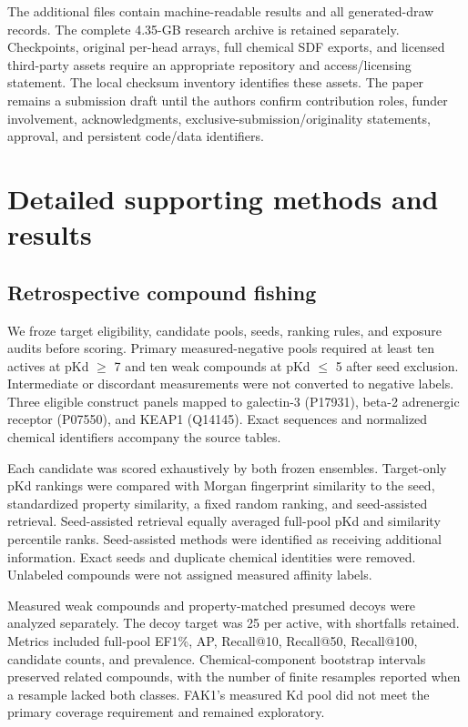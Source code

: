 \documentclass[12pt,a4paper]{article}
\begin{document}
The additional files contain machine-readable results and all generated-draw records. The complete 4.35-GB research archive is retained separately. Checkpoints, original per-head arrays, full chemical SDF exports, and licensed third-party assets require an appropriate repository and access/licensing statement. The local checksum inventory identifies these assets. The paper remains a submission draft until the authors confirm contribution roles, funder involvement, acknowledgments, exclusive-submission/originality statements, approval, and persistent code/data identifiers.

\section*{Detailed supporting methods and results}
\subsection*{Retrospective compound fishing}
We froze target eligibility, candidate pools, seeds, ranking rules, and exposure audits before scoring. Primary measured-negative pools required at least ten actives at pKd \(\geq\) 7 and ten weak compounds at pKd \(\leq\) 5 after seed exclusion. Intermediate or discordant measurements were not converted to negative labels. Three eligible construct panels mapped to galectin-3 (P17931), beta-2 adrenergic receptor (P07550), and KEAP1 (Q14145). Exact sequences and normalized chemical identifiers accompany the source tables.

Each candidate was scored exhaustively by both frozen ensembles. Target-only pKd rankings were compared with Morgan fingerprint similarity to the seed, standardized property similarity, a fixed random ranking, and seed-assisted retrieval. Seed-assisted retrieval equally averaged full-pool pKd and similarity percentile ranks. Seed-assisted methods were identified as receiving additional information. Exact seeds and duplicate chemical identities were removed. Unlabeled compounds were not assigned measured affinity labels.

Measured weak compounds and property-matched presumed decoys were analyzed separately. The decoy target was 25 per active, with shortfalls retained. Metrics included full-pool EF1\%, AP, Recall@10, Recall@50, Recall@100, candidate counts, and prevalence. Chemical-component bootstrap intervals preserved related compounds, with the number of finite resamples reported when a resample lacked both classes. FAK1's measured Kd pool did not meet the primary coverage requirement and remained exploratory.
\end{document}

